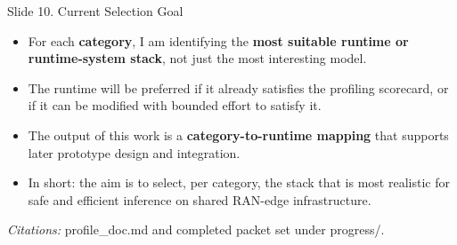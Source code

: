 \documentclass[aspectratio=169]{beamer}
\newcommand{\slidecite}[1]{\vspace{0.35em}\par{\tiny\raggedright\textit{Citations: }#1\par}}
\begin{document}
\begin{frame}[t]{Slide 10. Current Selection Goal}
\small
\begin{itemize}
  \item For each \textbf{category}, I am identifying the \textbf{most suitable runtime or runtime-system stack}, not just the most interesting model.
  \item The runtime will be preferred if it already satisfies the profiling scorecard, or if it can be modified with bounded effort to satisfy it.
  \item The output of this work is a \textbf{category-to-runtime mapping} that supports later prototype design and integration.
  \item In short: the aim is to select, per category, the stack that is most realistic for safe and efficient inference on shared RAN-edge infrastructure.
\end{itemize}
\slidecite{profile\_doc.md and completed packet set under progress/.}
\end{frame}
\end{document}

